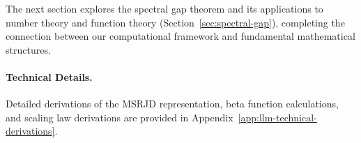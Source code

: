 The next section explores the spectral gap theorem and its applications to number theory and function theory (Section~\ref{sec:spectral-gap}), completing the connection between our computational framework and fundamental mathematical structures.

\paragraph{Technical Details.} Detailed derivations of the MSRJD representation, beta function calculations, and scaling law derivations are provided in Appendix~\ref{app:llm-technical-derivations}.
